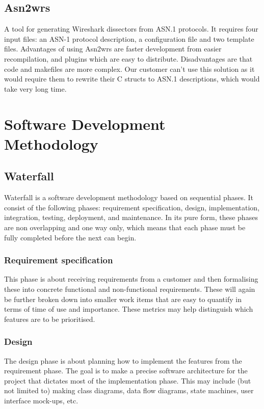 \subsection{Asn2wrs}
A tool for generating Wireshark dissectors from ASN.1 protocols. It requires
four input files: an ASN-1 protocol description, a configuration file and two
template files. Advantages of using Asn2wrs are faster development from
easier recompilation, and plugins which are easy to distribute. Disadvantages
are that code and makefiles are more complex. Our customer can't use this
solution as it would require them to rewrite their C structs to ASN.1
descriptions, which would take very long time.


\section{Software Development Methodology}
\label{sec:pre:method}

\subsection{Waterfall}
\label{sec:pre:waterfall}
Waterfall is a software development methodology based on sequential phases.
It consist of the following phases: requirement specification, design,
implementation, integration, testing, deployment, and maintenance. In its pure
form, these phases are non overlapping and one way only, which means that each
phase must be fully completed before the next can begin.

\subsubsection{Requirement specification}
This phase is about receiving requirements from a customer and then formalising
these into concrete functional and non-functional requirements. These will
again be further broken down into smaller work items that are easy to quantify
in terms of time of use and importance. These metrics may help distinguish
which features are to be prioritised.

\subsubsection{Design}
The design phase is about planning how to implement the features from the
requirement phase. The goal is to make a precise software architecture for the
project that dictates most of the implementation phase. This may include (but
not limited to) making class diagrams, data flow diagrams, state machines, user
interface mock-ups, etc.

